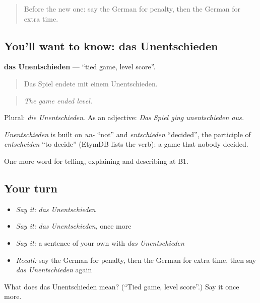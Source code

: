 \begin{quote}
Before the new one: say the German for penalty, then the German for extra time.
\end{quote}

\subsection*{You'll want to know: das Unentschieden}
\textbf{das Unentschieden} — \textquotedblleft{}tied game, level score\textquotedblright{}.

\begin{quote}
Das Spiel endete mit einem Unentschieden.
\end{quote}

\begin{quote}
\emph{The game ended level.}
\end{quote}

Plural: \emph{die Unentschieden}. As an adjective: \emph{Das Spiel ging unentschieden aus.}

\begin{cousinweb}
\emph{Unentschieden} is built on \emph{un-} \textquotedblleft{}not\textquotedblright{} and \emph{entschieden} \textquotedblleft{}decided\textquotedblright{}, the participle of \emph{entscheiden} \textquotedblleft{}to decide\textquotedblright{} (EtymDB lists the verb): a game that nobody decided.
\end{cousinweb}

\begin{grammarlens}[title={What you've built}]
One more word for telling, explaining and describing at B1.
\end{grammarlens}

\subsection*{Your turn}
\begin{itemize}
\raggedright
  \item \emph{Say it:} \emph{das Unentschieden}
  \item \emph{Say it:} \emph{das Unentschieden}, once more
  \item \emph{Say it:} a sentence of your own with \emph{das Unentschieden}
  \item \emph{Recall:} say the German for penalty, then the German for extra time, then say \emph{das Unentschieden} again
\end{itemize}

\begin{tcolorbox}[breakable,colback=teal!4,colframe=teal!35!black,title={Before you move on}]
What does das Unentschieden mean? (\textquotedblleft{}Tied game, level score\textquotedblright{}.) Say it once more.
\end{tcolorbox}
